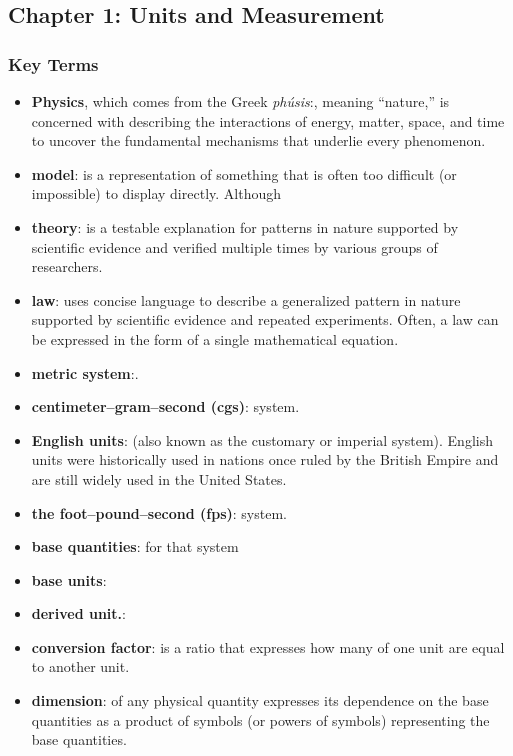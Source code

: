 \documentclass{report}
\begin{document}
    \pagebreak 
    \bigbreak \noindent 
    \subsection{Chapter 1: Units and Measurement}
    \smallbreak \noindent
    \subsubsection{Key Terms}
    \begin{itemize}
        \item \textbf{Physics}, which comes from the Greek \textit{phúsis}:, meaning “nature,” is concerned with describing the interactions of energy, matter, space, and time to uncover the fundamental mechanisms that underlie every phenomenon.
        \item \textbf{model}: is a representation of something that is often too difficult (or impossible) to display directly. Although
        \item \textbf{theory}: is a testable explanation for patterns in nature supported by scientific evidence and verified multiple times by various groups of researchers.
        \item \textbf{law}: uses concise language to describe a generalized pattern in nature supported by scientific evidence and repeated experiments. Often, a law can be expressed in the form of a single mathematical equation. 
        \item \textbf{metric system}:.
        \item \textbf{centimeter–gram–second (cgs)}: system.
        \item \textbf{English units}: (also known as the customary or imperial system). English units were historically used in nations once ruled by the British Empire and are still widely used in the United States.
        \item \textbf{the foot–pound–second (fps)}: system. 
        \item \textbf{base quantities}: for that system
        \item \textbf{base units}:
        \item \textbf{derived unit.}:
        \item \textbf{conversion factor}: is a ratio that expresses how many of one unit are equal to another unit.
        \item \textbf{dimension}: of any physical quantity expresses its dependence on the base quantities as a product of symbols (or powers of symbols) representing the base quantities.

\end{itemize}
\end{document}
